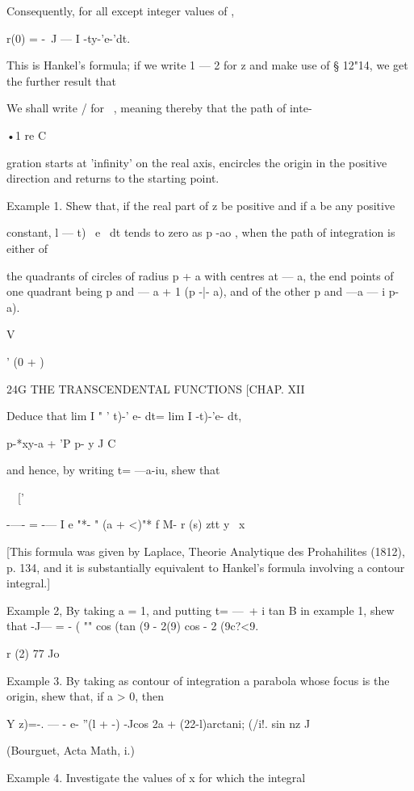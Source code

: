 Consequently, for all except integer values of  , 

r(0) = -\  J — I  -ty-'e-'dt. 

This is Hankel's formula; if we write 1 — 2 for z and make use of § 12"14, 
we get the further result that 

We shall write / for \ , meaning thereby that the path of inte- 

•1 re   C 

gration starts at 'infinity' on the real axis, encircles the origin in the positive 
direction and returns to the starting point. 

Example 1. Shew that, if the real part of z be positive and if a be any positive 

constant, l  — t)~ e~ dt tends to zero as p  -ao , when the path of integration is either of 

the quadrants of circles of radius p + a with centres at — a, the end points of one quadrant 
being p and — a + 1 (p -|- a), and of the other p and —a — i p- a). 



V 

' (0 + ) 



24G THE TRANSCENDENTAL FUNCTIONS [CHAP. XII 

Deduce that lim I " ' t)-' e- dt= lim I  -t)-'e- dt, 

p-*xy-a + 'P p- y  J C 

and hence, by writing t= —a-iu, shew that 

\ \ ['  

-—- = -— I e  "*- " (a +  <)"* f M- 
r (s) ztt y \ x 

[This formula was given by Laplace, Theorie Analytique des Prohahilites (1812), p. 134, 
and it is substantially equivalent to Hankel's formula involving a contour integral.] 

Example 2, By taking a = 1, and putting t= —\ + i tan B in example 1, shew that 
-J— = - ( "" cos (tan (9 - 2(9) cos  - 2 (9c?<9. 

r (2) 77 Jo 

Example 3. By taking as contour of integration a parabola whose focus is the origin, 
shew that, if a > 0, then 

Y z)=-. — - e- ''(l +  -) -Jcos 2a  + (22-l)arctani; (/i!. 
sin nz J 

(Bourguet, Acta Math, i.) 

Example 4. Investigate the values of x for which the integral 

